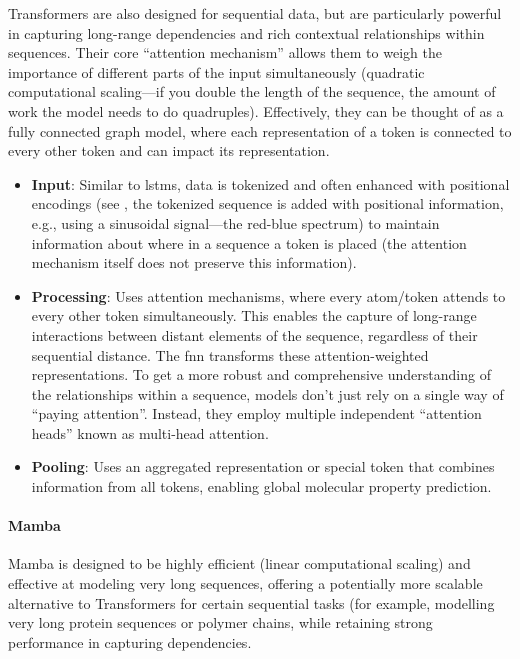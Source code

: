 Transformers \autocite{vaswani2017attention} are also designed for sequential data, but are particularly powerful in capturing long-range dependencies and rich contextual relationships within sequences. 
Their core \enquote{attention mechanism} allows them to weigh the importance of different parts of the input simultaneously (quadratic computational scaling---if you double the length of the sequence, the amount of work the model needs to do quadruples). 
Effectively, they can be thought of as a fully connected graph model,\autocite{velivckovic2023everything, joshi2025transformers} where each representation of a token is connected to every other token and can impact its representation.

\begin{itemize}
    \item \textbf{Input}: Similar to \glspl{lstm}, data is tokenized and often enhanced with positional encodings (see , the tokenized sequence is added with positional information, e.g., using a sinusoidal signal---the red-blue spectrum) to maintain information about where in a sequence a token is placed (the attention mechanism itself does not preserve this information).
    \item \textbf{Processing}:  Uses attention mechanisms, where every atom/token attends to every other token simultaneously. This enables the capture of long-range interactions between distant elements of the sequence, regardless of their sequential distance. The \gls{fnn} transforms these attention-weighted representations.  To get a more robust and comprehensive understanding of the relationships within a sequence, models don't just rely on a single way of \enquote{paying attention}.  Instead, they employ multiple independent \enquote{attention heads} known as multi-head attention.
    \item \textbf{Pooling}:  Uses an aggregated representation or special token that combines information from all tokens, enabling global molecular property prediction.
\end{itemize}

\paragraph{Mamba}
Mamba\autocite{gu2023mamba0} is designed to be highly efficient (linear computational scaling) and effective at modeling very long sequences, offering a potentially more scalable alternative to Transformers for certain sequential tasks (for example, modelling very long protein sequences or polymer chains, while retaining strong performance in capturing dependencies.

